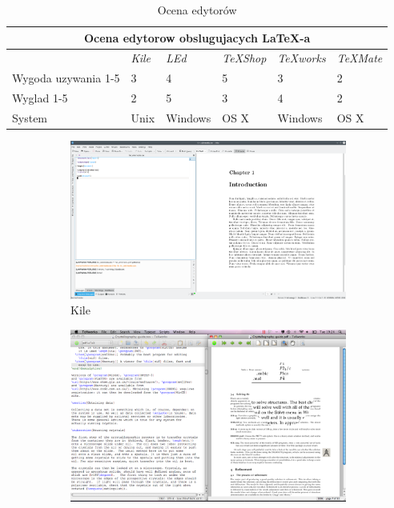 \documentclass{article}
\begin{document}
\begin{table}[h!]
\caption{Ocena edytorów}
\label{tab:ocena}
\begin{tabular}{|l|l|l|l|l|l|}
\hline
\multicolumn{6}{|c|}{\textbf{Ocena edytorow obslugujacych LaTeX-a}} \\ \hline
 & \textit{Kile} & \textit{LEd} & \textit{TeXShop} & \textit{TeXworks}  & \textit{TeXMate} \\ \hline
Wygoda uzywania 1-5 & 3 & 4 & 5 & 3 & 2 \\ \hline
Wyglad 1-5 & 2 & 5 & 3 & 4 & 2 \\ \hline
System & Unix & Windows & OS X & Windows & OS X \\ \hline
\end{tabular}
\end{table}

\begin{figure}[h!]
  \centering
  \begin{subfigure}[b]{0.4\linewidth}
    \includegraphics[width=\linewidth]{kile.png}
    \caption{Kile}
  \end{subfigure}
  \begin{subfigure}[b]{0.4\linewidth}
    \includegraphics[width=\linewidth]{texworks.png}

\end{subfigure}
\end{figure}
\end{document}
